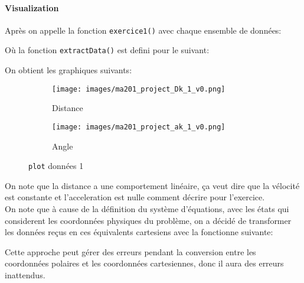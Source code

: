 \documentclass{article}
\begin{document}
\paragraph{Visualization}Après on appelle la fonction \texttt{exercice1()} avec chaque ensemble de données:
\begin{scriptsize}\mycode
    
    
\end{scriptsize}
Où la fonction \texttt{extractData()} est defini pour le suivant:
\begin{scriptsize}\mycode
    
\end{scriptsize}
On obtient les graphiques suivants:
\begin{figure}[H]
    \centering
    \begin{subfigure}[H]{.45\textwidth}
        \centering
        \texttt{[image: images/ma201\_project\_Dk\_1\_v0.png]}
        \caption{Distance}
    \end{subfigure}
    \begin{subfigure}[H]{.45\textwidth}
        \centering
        \texttt{[image: images/ma201\_project\_ak\_1\_v0.png]}
        \caption{Angle}
    \end{subfigure}
    \caption{\texttt{plot} données 1}
\end{figure}\noindent
On note que la distance a une comportement linéaire, ça veut dire que la vélocité est constante et l'acceleration est nulle comment décrire pour l'exercice.\\

\newpage\noindent On note que à cause de la définition du système d'équations, avec les états qui considerent les coordonnées physiques du problème, on a décidé de transformer les données reçus en ces équivalents cartesiens avec la fonctionne suivante:
\begin{scriptsize}\mycode
    
\end{scriptsize}
Cette approche peut gérer des erreurs pendant la conversion entre les coordonnées polaires et les coordonnées cartesiennes, donc il aura des erreurs inattendus.\\
\end{document}
